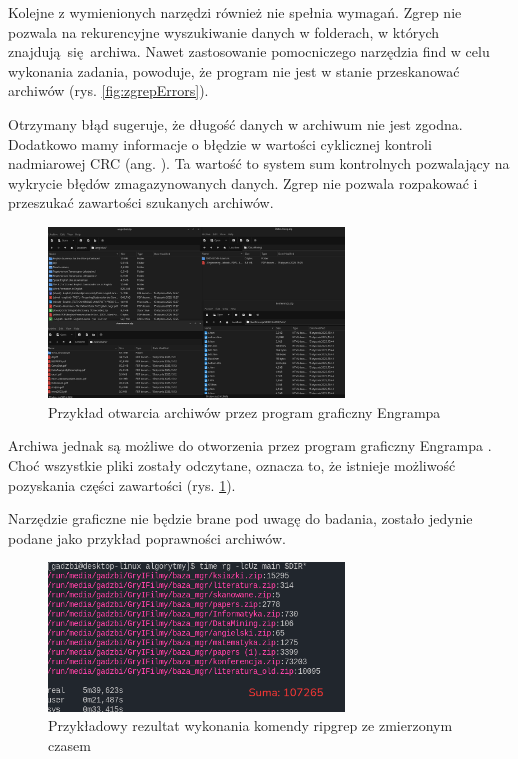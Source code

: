 Kolejne z wymienionych narzędzi również nie spełnia wymagań. Zgrep nie pozwala
na rekurencyjne wyszukiwanie danych w folderach, w których znajdują się archiwa.
Nawet zastosowanie pomocniczego narzędzia find w celu wykonania zadania,
powoduje, że program nie jest w stanie przeskanować archiwów (rys. \ref{fig:zgrepErrors}).

Otrzymany błąd sugeruje, że długość danych w archiwum nie jest zgodna. Dodatkowo
mamy informacje o błędzie w wartości cyklicznej kontroli nadmiarowej CRC
(ang. ). Ta wartość to system sum kontrolnych
pozwalający na wykrycie błędów zmagazynowanych danych. Zgrep nie pozwala 
rozpakować i przeszukać zawartości szukanych archiwów.

\begin{figure}[h]
\centering
\includegraphics[width=0.7\textwidth]{./images/przykład-otwarcia-archiwów.png}
\caption{Przykład otwarcia archiwów przez program graficzny Engrampa}
\label{fig:engrampaExample}
\end{figure}

Archiwa jednak są możliwe do otworzenia przez program graficzny Engrampa \cite{bib:internet:EngrampaArchives}.
Choć wszystkie pliki zostały odczytane, oznacza to, że istnieje możliwość pozyskania
części zawartości (rys. \ref{fig:engrampaExample}).

Narzędzie graficzne nie będzie brane pod uwagę do badania, zostało jedynie podane
jako przykład poprawności archiwów.

\begin{figure}[h]
\centering
\includegraphics[width=0.7\textwidth]{./images/ripgrep-result-main.png}
\caption{Przykładowy rezultat wykonania komendy ripgrep ze zmierzonym czasem}
\label{fig:ripgrepResultMain}
\end{figure}

